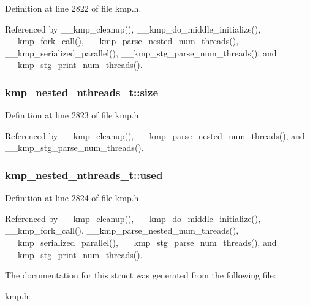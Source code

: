 Definition at line 2822 of file kmp.\-h.



Referenced by \-\_\-\-\_\-kmp\-\_\-cleanup(), \-\_\-\-\_\-kmp\-\_\-do\-\_\-middle\-\_\-initialize(), \-\_\-\-\_\-kmp\-\_\-fork\-\_\-call(), \-\_\-\-\_\-kmp\-\_\-parse\-\_\-nested\-\_\-num\-\_\-threads(), \-\_\-\-\_\-kmp\-\_\-serialized\-\_\-parallel(), \-\_\-\-\_\-kmp\-\_\-stg\-\_\-parse\-\_\-num\-\_\-threads(), and \-\_\-\-\_\-kmp\-\_\-stg\-\_\-print\-\_\-num\-\_\-threads().

\hypertarget{structkmp__nested__nthreads__t_adee4be6710fdc135bda1098d9f61458e}{
\subsubsection[{size}]{ kmp\-\_\-nested\-\_\-nthreads\-\_\-t\-::size}}\label{structkmp__nested__nthreads__t_adee4be6710fdc135bda1098d9f61458e}


Definition at line 2823 of file kmp.\-h.



Referenced by \-\_\-\-\_\-kmp\-\_\-cleanup(), \-\_\-\-\_\-kmp\-\_\-parse\-\_\-nested\-\_\-num\-\_\-threads(), and \-\_\-\-\_\-kmp\-\_\-stg\-\_\-parse\-\_\-num\-\_\-threads().

\hypertarget{structkmp__nested__nthreads__t_aa7837e3819e8a02eb1fafcc4ff890939}{
\subsubsection[{used}]{ kmp\-\_\-nested\-\_\-nthreads\-\_\-t\-::used}}\label{structkmp__nested__nthreads__t_aa7837e3819e8a02eb1fafcc4ff890939}


Definition at line 2824 of file kmp.\-h.



Referenced by \-\_\-\-\_\-kmp\-\_\-cleanup(), \-\_\-\-\_\-kmp\-\_\-do\-\_\-middle\-\_\-initialize(), \-\_\-\-\_\-kmp\-\_\-fork\-\_\-call(), \-\_\-\-\_\-kmp\-\_\-parse\-\_\-nested\-\_\-num\-\_\-threads(), \-\_\-\-\_\-kmp\-\_\-serialized\-\_\-parallel(), \-\_\-\-\_\-kmp\-\_\-stg\-\_\-parse\-\_\-num\-\_\-threads(), and \-\_\-\-\_\-kmp\-\_\-stg\-\_\-print\-\_\-num\-\_\-threads().



The documentation for this struct was generated from the following file\-:\begin{DoxyCompactItemize}
\item 
\hyperlink{kmp_8h}{kmp.\-h}\end{DoxyCompactItemize}
